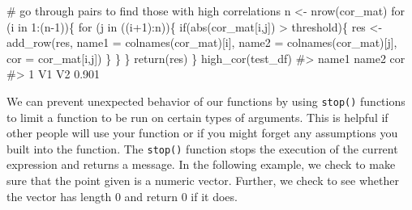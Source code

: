 \documentclass[
  letterpaper,
]{latex/krantz}
\makeatletter
\newenvironment{Shaded}{\begin{snugshade}}{\end{snugshade}}
\newcommand{\AttributeTok}[1]{\textcolor[rgb]{0.40,0.45,0.13}{#1}}
\newcommand{\CommentTok}[1]{\textcolor[rgb]{0.37,0.37,0.37}{#1}}
\newcommand{\ControlFlowTok}[1]{\textcolor[rgb]{0.00,0.23,0.31}{#1}}
\newcommand{\DecValTok}[1]{\textcolor[rgb]{0.68,0.00,0.00}{#1}}
\newcommand{\FunctionTok}[1]{\textcolor[rgb]{0.28,0.35,0.67}{#1}}
\newcommand{\NormalTok}[1]{\textcolor[rgb]{0.00,0.23,0.31}{#1}}
\newcommand{\OtherTok}[1]{\textcolor[rgb]{0.00,0.23,0.31}{#1}}
\newcommand{\SpecialCharTok}[1]{\textcolor[rgb]{0.37,0.37,0.37}{#1}}
\newenvironment{kframe}{%
\medskip{}
\setlength{\fboxsep}{.8em}
 \def\at@end@of@kframe{}%
 \ifinner\ifhmode%
  \def\at@end@of@kframe{\end{minipage}}%
  \begin{minipage}{\columnwidth}%
 \fi\fi%
 \def\FrameCommand##1{\hskip\@totalleftmargin \hskip-\fboxsep
 \colorbox{shadecolor}{##1}\hskip-\fboxsep
     \hskip-\linewidth \hskip-\@totalleftmargin \hskip\columnwidth}%
 \MakeFramed {\advance\hsize-\width
   \@totalleftmargin\z@ \linewidth\hsize
   \@setminipage}}%
 {\par\unskip\endMakeFramed%
 \at@end@of@kframe}
\renewenvironment{Shaded}{\begin{kframe}}{\end{kframe}}
\makeatother
\begin{document}
\begin{Shaded}
\begin{Highlighting}[]
  \CommentTok{\# go through pairs to find those with high correlations}
\NormalTok{  n }\OtherTok{\textless{}{-}} \FunctionTok{nrow}\NormalTok{(cor\_mat)}
  \ControlFlowTok{for}\NormalTok{ (i }\ControlFlowTok{in} \DecValTok{1}\SpecialCharTok{:}\NormalTok{(n}\DecValTok{{-}1}\NormalTok{))\{}
    \ControlFlowTok{for}\NormalTok{ (j }\ControlFlowTok{in}\NormalTok{ ((i}\SpecialCharTok{+}\DecValTok{1}\NormalTok{)}\SpecialCharTok{:}\NormalTok{n))\{}
      \ControlFlowTok{if}\NormalTok{(}\FunctionTok{abs}\NormalTok{(cor\_mat[i,j]) }\SpecialCharTok{\textgreater{}}\NormalTok{ threshold)\{}
\NormalTok{        res }\OtherTok{\textless{}{-}} \FunctionTok{add\_row}\NormalTok{(res, }
                       \AttributeTok{name1 =} \FunctionTok{colnames}\NormalTok{(cor\_mat)[i],}
                       \AttributeTok{name2 =} \FunctionTok{colnames}\NormalTok{(cor\_mat)[j],}
                       \AttributeTok{cor =}\NormalTok{ cor\_mat[i,j])}
\NormalTok{      \}}
\NormalTok{    \}}
\NormalTok{  \}}
  \FunctionTok{return}\NormalTok{(res)}
\NormalTok{\}}
\FunctionTok{high\_cor}\NormalTok{(test\_df)}
\CommentTok{\#\textgreater{}   name1 name2   cor}
\CommentTok{\#\textgreater{} 1    V1    V2 0.901}
\end{Highlighting}
\end{Shaded}

We can prevent unexpected behavior of our functions by using
\texttt{stop()} functions to
limit a function to be run on certain types of
arguments. This is helpful if other people will
use your function or if you might forget any assumptions you built into
the function. The \texttt{stop()} function stops the execution of the
current expression and returns a message. In the following example, we
check to make sure that the point given is a numeric vector. Further, we
check to see whether the vector has length 0 and return 0 if it does.
\end{document}
